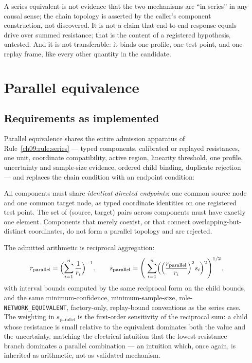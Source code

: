 \begin{remark}\label{ch09:rem:series-not}
A series equivalent is not evidence that the two mechanisms are ``in
series'' in any causal sense; the chain topology is asserted by the
caller's component construction, not discovered. It is not a claim that
end-to-end response equals drive over summed resistance; that is the
content of a registered hypothesis, untested. And it is not transferable:
it binds one profile, one test point, and one replay frame, like every
other quantity in the candidate.
\end{remark}

\section{Parallel equivalence}\label{ch09:sec:parallel}

\subsection{Requirements as implemented}

Parallel equivalence shares the entire admission apparatus of
Rule~\ref{ch09:rule:series} --- typed components, calibrated or replayed
resistances, one unit, coordinate compatibility, active region, linearity
threshold, one profile, uncertainty and sample-size evidence, ordered child
binding, duplicate rejection --- and replaces the chain condition with an
endpoint condition:

\begin{ruleenv}\label{ch09:rule:parallel}
All components must share \emph{identical directed endpoints}: one
common source node and one common target node, as typed coordinate
identities on one registered test point. The set of (source, target) pairs
across components must have exactly one element. Components that merely
coexist, or that connect overlapping-but-distinct coordinates, do not form
a parallel topology and are rejected.
\end{ruleenv}

The admitted arithmetic is reciprocal aggregation:
\[
r_{\mathrm{parallel}} = \Bigl(\sum_{i=1}^{n} \frac{1}{r_i}\Bigr)^{-1},
\qquad
s_{\mathrm{parallel}} = \Biggl(\;\sum_{i=1}^{n}
\Bigl(\Bigl(\frac{r_{\mathrm{parallel}}}{r_i}\Bigr)^{2} s_i\Bigr)^{2}
\Biggr)^{1/2},
\]
with interval bounds computed by the same reciprocal form on the child
bounds, and the same minimum-confidence, minimum-sample-size,
role-\texttt{NETWORK\_EQUIVALENT}, factory-only, replay-bound conventions
as the series case. The weighting in $s_{\mathrm{parallel}}$ is the
first-order sensitivity of the reciprocal sum: a child whose resistance
is small relative to the equivalent dominates both the value and the
uncertainty, matching the electrical intuition that the lowest-resistance
branch dominates a parallel combination --- an intuition which, once
again, is inherited as arithmetic, not as validated mechanism.

